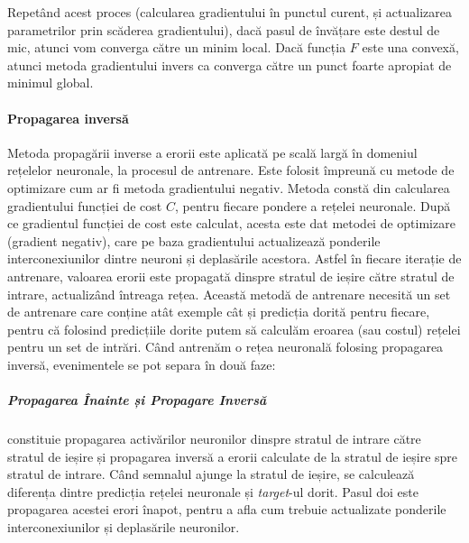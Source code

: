 Repetând acest proces (calcularea gradientului în punctul curent, și actualizarea parametrilor prin scăderea gradientului), dacă pasul de învățare este destul de mic, atunci vom converga către un minim local. Dacă funcția $F$ este una convexă, atunci metoda gradientului invers ca converga către un punct foarte apropiat de minimul global.

\paragraph{Propagarea inversă}
Metoda propagării inverse a erorii este aplicată pe scală largă în domeniul rețelelor neuronale, la procesul de antrenare. Este folosit împreună cu metode de optimizare cum ar fi metoda gradientului negativ.\newline
Metoda constă din calcularea gradientului funcției de cost $C$, pentru fiecare pondere a rețelei neuronale. După ce gradientul funcției de cost este calculat, acesta este dat metodei de optimizare (gradient negativ), care pe baza gradientului actualizează ponderile interconexiunilor dintre neuroni și deplasările acestora. Astfel în fiecare iterație de antrenare, valoarea erorii este propagată dinspre stratul de ieșire către stratul de intrare, actualizând întreaga rețea.\newline
Această metodă de antrenare necesită un set de antrenare care conține atât exemple cât și predicția dorită pentru fiecare, pentru că folosind predicțiile dorite putem să calculăm eroarea (sau costul) rețelei pentru un set de intrări. Când antrenăm o rețea neuronală folosing propagarea inversă, evenimentele se pot separa în două faze:\newline

\subparagraph{Propagarea Înainte și Propagare Inversă} constituie propagarea activărilor neuronilor dinspre stratul de intrare către stratul de ieșire și propagarea inversă a erorii calculate de la stratul de ieșire spre stratul de intrare. Când semnalul ajunge la stratul de ieșire, se calculează diferența dintre predicția rețelei neuronale și \textit{target}-ul dorit. Pasul doi este propagarea acestei erori înapot, pentru a afla cum trebuie actualizate ponderile interconexiunilor și deplasările neuronilor.

